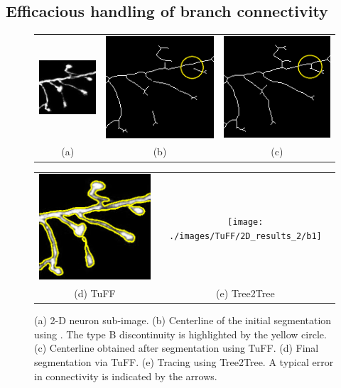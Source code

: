 \subsection{Efficacious handling of branch connectivity}
\begin{figure}[h]
\renewcommand{\tabcolsep}{0.05cm}
\begin{tabular}{ccc}
	\includegraphics[width=.32\linewidth]{./images/TuFF/TypeB_demo/neuron9_cropped}
	&\includegraphics[width=.32\linewidth]{./images/TuFF/TypeB_demo/demo2_skel}
	& \includegraphics[width=.32\linewidth]{./images/TuFF/TypeB_demo/demo2_postSeg}
	\\
	\scriptsize (a) & \scriptsize (b) & \scriptsize (c)
\end{tabular}
\centering
\begin{tabular}{cc}
	\includegraphics[width=.325\linewidth]{./images/TuFF/TypeB_demo/demo2_segmented}
	&\texttt{[image: ./images/TuFF/2D\_results\_2/b1]} \\
	\scriptsize (d) TuFF & \scriptsize (e) Tree2Tree
\end{tabular}
\caption[TuFF vs Tree2Tree]{(a) 2-D neuron sub-image. (b) Centerline of the initial segmentation using \cite{otsu}. The type B discontinuity is highlighted by the yellow circle. (c) Centerline obtained after segmentation using TuFF. (d) Final segmentation via TuFF. (e) Tracing using Tree2Tree. A typical error in connectivity is indicated by the arrows.}
\label{fig:Tuff_vs_T2T}
\end{figure}
